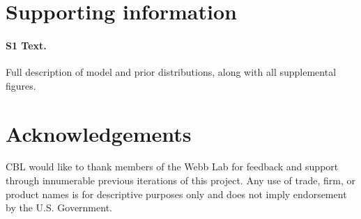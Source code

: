 \documentclass[10pt,letterpaper]{article}
\begin{document}
\section*{Supporting information}

\paragraph*{S1 Text.}
\label{S1}
{Full description of model and prior distributions, along with all supplemental figures.}

\section*{Acknowledgements}

CBL would like to thank members of the Webb Lab for feedback and support through innumerable previous iterations of this project.
Any use of trade, firm, or product names is for descriptive purposes only and does not imply endorsement by the U.S. Government.

\nolinenumbers

%
%
% 



\end{document}
